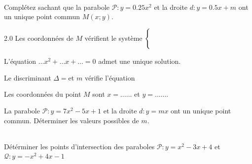 \documentclass[main.tex]{subfiles}
\begin{document}
\begin{exercise}  \hfill \\
Complétez sachant que la parabole  $\mathscr{P}\colon y=0.25x^2$ et la droite $d\colon y =0.5x+m$ ont un unique point commun $M(x;y)$. 
\begin{spacing}{2.0}  
Les coordonnées de $M$ vérifient le système $\begin{cases} \dotfill \\ \dotfill \end{cases}$

\vfill

L'équation $\ldots x^2 +\ldots x + \ldots =0$ admet une unique solution.
	
Le discriminant $\Delta=$\dotfill et $m$ vérifie l'équation \dotfill 

\vfill

Les coordonnées du point $M$ sont $x= \ldots\ldots$ et $y=\ldots \ldots$.
\end{spacing}
\end{exercise}
\begin{exercise} %
La parabole  $\mathscr{P}\colon y=7x^2-5x+1$ et la droite $d\colon y =mx$ ont un unique point commun. Déterminer les valeurs possibles de $m$.
\end{exercise} 
\begin{exercise}   \hfill \\
	 Détérminer les  points d'intersection des paraboles   $\mathscr{P}\colon y=x^2-3x+4$ et $\mathscr{Q}\colon y =-x^2+4x-1$ 
\end{exercise} 
\end{document}

